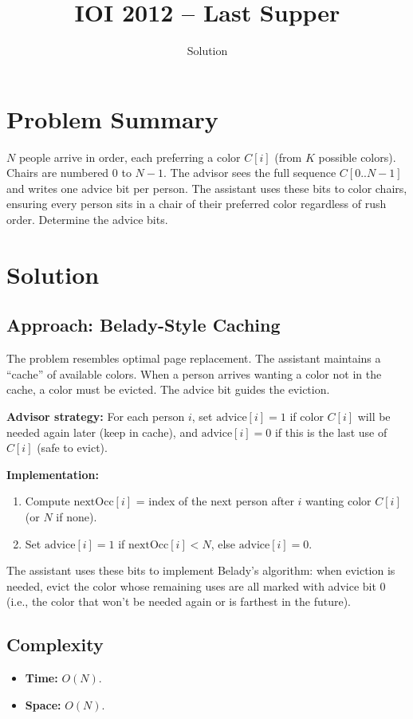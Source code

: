 \documentclass[11pt,a4paper]{article}
\title{IOI 2012 -- Last Supper}
\author{Solution}
\date{}
\begin{document}
\maketitle

\section{Problem Summary}
$N$ people arrive in order, each preferring a color $C[i]$ (from $K$ possible colors). Chairs are numbered $0$ to $N-1$. The advisor sees the full sequence $C[0..N-1]$ and writes one advice bit per person. The assistant uses these bits to color chairs, ensuring every person sits in a chair of their preferred color regardless of rush order. Determine the advice bits.

\section{Solution}

\subsection{Approach: Belady-Style Caching}
The problem resembles optimal page replacement. The assistant maintains a ``cache'' of available colors. When a person arrives wanting a color not in the cache, a color must be evicted. The advice bit guides the eviction.

\textbf{Advisor strategy:} For each person $i$, set $\text{advice}[i] = 1$ if color $C[i]$ will be needed again later (keep in cache), and $\text{advice}[i] = 0$ if this is the last use of $C[i]$ (safe to evict).

\textbf{Implementation:}
\begin{enumerate}
    \item Compute $\text{nextOcc}[i]$ = index of the next person after $i$ wanting color $C[i]$ (or $N$ if none).
    \item Set $\text{advice}[i] = 1$ if $\text{nextOcc}[i] < N$, else $\text{advice}[i] = 0$.
\end{enumerate}

The assistant uses these bits to implement Belady's algorithm: when eviction is needed, evict the color whose remaining uses are all marked with advice bit $0$ (i.e., the color that won't be needed again or is farthest in the future).

\subsection{Complexity}
\begin{itemize}
    \item \textbf{Time:} $O(N)$.
    \item \textbf{Space:} $O(N)$.
\end{itemize}
\end{document}
